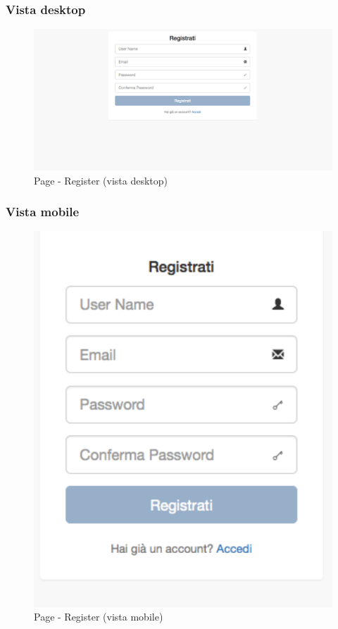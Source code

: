 		\subsubsection{Vista desktop} %
		\begin{figure}[!h]
			\centering
			\centerline{\includegraphics[scale=0.4]{./images/mockup/register_vd.pdf}}
			\caption{Page - Register (vista desktop)}
		\end{figure}

		\subsubsection{Vista mobile} %
		\begin{figure}[!h]
			\centering
			\centerline{\includegraphics[scale=0.5]{./images/mockup/register_vm.pdf}}
			\caption{Page - Register (vista mobile)}
		\end{figure}


